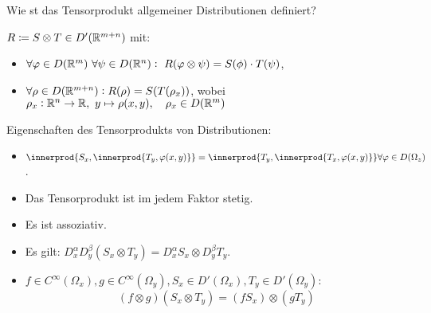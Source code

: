 \documentclass[9pt]{article}
\newcommand{\Rn}{\mathbb{R}^n}
\newcommand{\R}[1]{%
	\ifthenelse{\equal{#1}{}}
		{\mathbb{R}}
		{\mathbb{R}^{#1}}}%
\DeclarePairedDelimiter{\innerprod}\langle\rangle
\newenvironment{field}{}{\newpage}
\newif\ifnote
\newenvironment{note}{\notetrue}{\notefalse}
\begin{document}
\begin{note}
					\begin{field}  %
						Wie st das Tensorprodukt allgemeiner Distributionen definiert?
					\end{field}
					
					\begin{field}  %
						$R\coloneqq S\otimes T \in D'(\R{m+n})$ mit:
						\begin{itemize}
							\item $\forall \varphi \in D(\R{m}) \ \forall \psi \in D(\Rn): \ R(\varphi \otimes \psi) = S(\phi) \cdot T(\psi)$,
							\item $\forall \rho \in D(\R{m+n}): R(\rho) = S(T(\rho_x))$, wobei \\
							$\rho_x : \R{n} \rightarrow \R{}, \ y \mapsto \rho(x,y), \quad \rho_x \in D(\R{m})$
						\end{itemize}						
					\end{field}
						
					\begin{field}  %
						Eigenschaften des Tensorprodukts von Distributionen:
					\end{field}
					
					\begin{field}  %
						\begin{itemize}
							\item $\innerprod{S_x,\innerprod{T_y, \varphi(x,y)}} = \innerprod{T_y,\innerprod{ T_x, \varphi(x,y)}} \forall \varphi \in D(\Omega_z)$.
							\item Das Tensorprodukt ist im jedem Faktor stetig.
							\item Es ist assoziativ.
							\item Es gilt: $D^\alpha_xD^\beta_y (S_x\otimes T_y) = D^\alpha_xS_x\otimes D^\beta_y T_y $.
							\item $f\in C^\infty(\Omega_x), g \in C^\infty(\Omega_y), S_x \in D'(\Omega_x), T_y
							\in D'(\Omega_y)$: 
							\begin{equation*}
								(f\otimes g) (S_x \otimes T_y) = (fS_x)\otimes(gT_y)
							\end{equation*}
						\end{itemize}
					\end{field}
				\end{note}
\end{document}
